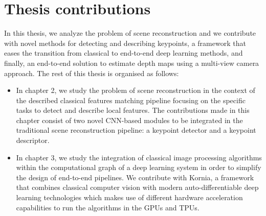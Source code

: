 \section{Thesis contributions} 

In this thesis, we analyze the problem of scene reconstruction and we contribute with novel methods for detecting and describing keypoints, a framework that eases the transition from classical to end-to-end deep learning methods, and finally, an end-to-end solution to estimate depth maps using a multi-view camera approach. The rest of this thesis is organised as follows:

\begin{itemize}
    \item In chapter 2, we study the problem of scene reconstruction in the context of the described classical features matching pipeline focusing on the specific tasks to detect and describe local features. The contributions made in this chapter consist of two novel CNN-based modules to be integrated in the traditional scene reconstruction pipeline: a keypoint detector and a keypoint descriptor.
    
    \item In chapter 3, we study the integration of classical image processing algorithms within the computational graph of a deep learning system in order to simplify the design of end-to-end pipelines. We contribute with Kornia, a framework that combines classical computer vision with modern auto-differentiable deep learning technologies which makes use of different hardware acceleration capabilities to run the algorithms in the GPUs and TPUs. 
    

\end{itemize}
